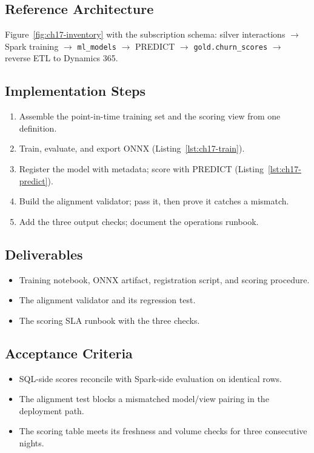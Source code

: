 \subsection*{Reference Architecture}
Figure~\ref{fig:ch17-inventory} with the subscription schema: silver interactions $\rightarrow$ Spark training $\rightarrow$ \texttt{ml\_models} $\rightarrow$ PREDICT $\rightarrow$ \texttt{gold.churn\_scores} $\rightarrow$ reverse ETL to Dynamics 365.

\subsection*{Implementation Steps}
\begin{enumerate}
    \item Assemble the point-in-time training set and the scoring view from one definition.
    \item Train, evaluate, and export ONNX (Listing~\ref{lst:ch17-train}).
    \item Register the model with metadata; score with PREDICT (Listing~\ref{lst:ch17-predict}).
    \item Build the alignment validator; pass it, then prove it catches a mismatch.
    \item Add the three output checks; document the operations runbook.
\end{enumerate}

\subsection*{Deliverables}
\begin{itemize}
    \item Training notebook, ONNX artifact, registration script, and scoring procedure.
    \item The alignment validator and its regression test.
    \item The scoring SLA runbook with the three checks.
\end{itemize}

\subsection*{Acceptance Criteria}
\begin{itemize}
    \item SQL-side scores reconcile with Spark-side evaluation on identical rows.
    \item The alignment test blocks a mismatched model/view pairing in the deployment path.
    \item The scoring table meets its freshness and volume checks for three consecutive nights.
\end{itemize}


